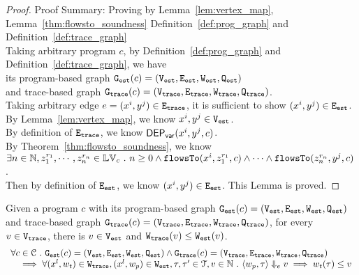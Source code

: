 \begin{proof}
Proof Summary: Proving by Lemma~\ref{lem:vertex_map}, Lemma~\ref{thm:flowsto_soundness} Definition~\ref{def:prog_graph} and Definition~\ref{def:trace_graph}
\\
Taking arbitrary program $c$,
by Definition~\ref{def:prog_graph} and Definition~\ref{def:trace_graph}, 
we have   
\\
its program-based graph $\mathtt{{G_{est}}}({c}) = (\mathtt{{V_{est}}}, \mathtt{{E_{est}}}, \mathtt{{W_{est}}}, \mathtt{{Q_{est}}})$ 
\\
and 
trace-based graph $\mathtt{{G_{trace}}}({c}) = (\mathtt{{V_{trace}}}, \mathtt{{E_{trace}}}, \mathtt{{W_{trace}}}, \mathtt{{Q_{trace}}})$.
\\
Taking arbitrary edge $e = (x^i, y^j) \in \mathtt{{E_{trace}}}$, it is sufficient to show $(x^i, y^j) \in \mathtt{{E_{est}}}$.
\\
By Lemma~\ref{lem:vertex_map}, we know $x^i, y^j \in \mathtt{{V_{est}}}$.
\\
By definition of $\mathtt{{E_{trace}}}$, we know $\mathsf{DEP_{var}}(x^i, y^j, c)$.
\\
By Theorem~\ref{thm:flowsto_soundness}, we know $ \exists n \in \mathbb{N}, z_1^{r_1}, \cdots, z_n^{r_n} \in \mathbb{LV}_{{c}} ~.~ 
n \geq 0 \land
\mathtt{flowsTo}(x^i,  z_1^{r_1}, c) 
\land \cdots \land \mathtt{flowsTo}(z_n^{r_n}, y^j, c) $.
\\
Then by definition of $\mathtt{{E_{est}}}$, we know $(x^i, y^j) \in \mathtt{{E_{est}}}$. This Lemma is proved.
\end{proof}
%
\begin{lem}
	\label{lem:weights_map}
	Given a program $c$ with its
	program-based graph $\mathtt{{G_{est}}}({c}) = (\mathtt{{V_{est}}}, \mathtt{{E_{est}}}, \mathtt{{W_{est}}}, \mathtt{{Q_{est}}})$
	and 
	trace-based graph $\mathtt{{G_{trace}}}({c}) = (\mathtt{{V_{trace}}}, \mathtt{{E_{trace}}}, \mathtt{{W_{trace}}}, \mathtt{{Q_{trace}}})$,
	for every $v \in \mathtt{{V_{trace}}}$, there is $v \in \mathtt{{V_{est}}}$ and $\mathtt{{W_{trace}}}(v) \leq \mathtt{{W_{est}}}(v)$.
	\[
		\begin{array}{l}
			\forall c \in \mathcal{C} 
			 ~.~ 
			 \mathtt{{G_{est}}}({c}) = (\mathtt{{V_{est}}}, \mathtt{{E_{est}}}, \mathtt{{W_{est}}}, \mathtt{{Q_{est}}})
			\land 
			\mathtt{{G_{trace}}}({c}) = (\mathtt{{V_{trace}}}, \mathtt{{E_{trace}}}, \mathtt{{W_{trace}}}, \mathtt{{Q_{trace}}})
			\\ \quad
			\implies
			\forall (x^l, w_{t}) \in \mathtt{{W_{trace}}},
			(x^l, w_{p}) \in \mathtt{{W_{est}}}, \mathtt{\tau}, \mathtt{\tau}' \in \mathcal{T}, v \in \mathbb{N} ~.~
			\langle w_{p}, \mathtt{\tau} \rangle \Downarrow_e v
			\implies
			w_{t}(\mathtt{\tau}) \leq v
		\end{array}
		\]
	\end{lem}
